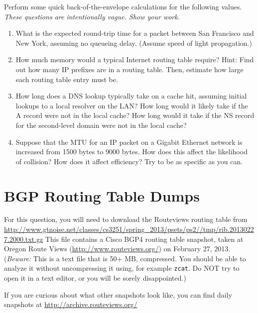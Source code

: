 \documentclass[11pt]{article}
\begin{document}
Perform some quick back-of-the-envelope calculations for the following
values.  {\em These questions are intentionally vague.  Show your work.}
\begin{enumerate}
\item What is the expected round-trip time for a packet between San
  Francisco and New York, assuming no queueing delay. (Assume speed of
  light propagation.)
\item How much memory would a typical Internet routing table require?
  Hint: Find out how many IP prefixes are in a routing table.  Then,
  estimate how large each routing table entry must be.
\item How long does a DNS lookup typically take on a cache hit, assuming
  initial lookups to a local resolver on the LAN?  How long would it likely take
  if the A record were not in the local cache?  How long would it take
  if the NS record for the second-level domain were not in the local
  cache?
\item Suppose that the MTU for an IP packet on a Gigabit Ethernet network is
  increased from 1500 bytes to 9000 bytes.  How does this affect the
  likelihood of collision?  How does it affect efficiency?  Try to be as
  specific as you can.
\end{enumerate}


\section{BGP Routing Table Dumps}

For this question, you will need to download the Routeviews routing
table from
\url{http://www.gtnoise.net/classes/cs3251/spring_2013/psets/ps2//tmp/rib.20130227.2000.txt.gz}
This file contains a Cisco BGP4 routing table snapshot, taken at Oregon
Route Views (\url{http://www.routeviews.org/}) on February 27,
2013. ({\em Beware:} This is a text file that is 50+ MB, compressed.
You should be able to analyze it without uncompressing it using, for
example {\tt zcat}.  Do NOT try to open it in a text editor, or you will
be sorely disappointed.)

If you are curious about what other snapshots look like, you
can find daily snapshots at \url{http://archive.routeviews.org/}
\end{document}
